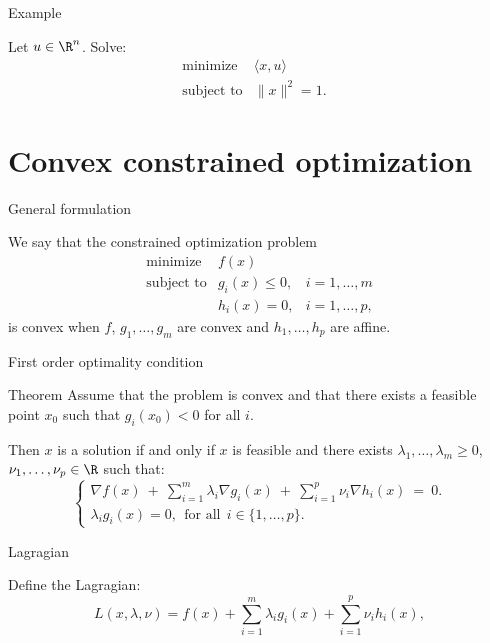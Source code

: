 \documentclass{beamer}
\begin{document}
\begin{frame}[t]{Example}
	\grid

	Let $u \in \R^n$. Solve:
	$$
		\begin{array}{lll}
			\text{minimize} & \langle x,u \rangle & \\
			\text{subject to} & \|x\|^2 = 1.
		\end{array}
	$$
\end{frame}


\section{Convex constrained optimization}


\begin{frame}[t]{General formulation}
	\grid

	We say that the constrained optimization problem
	\begin{equation}
		\begin{array}{lll}
			\text{minimize} & f(x) & \\
			\text{subject to} & g_i(x) \leq 0, & i=1, \dots, m \\
							  & h_i(x) = 0, & i=1, \dots, p,
		\end{array}
	\end{equation}
	is convex when $f$, $g_1, \dots, g_m$ are convex and $h_1, \dots, h_p$ are affine.
\end{frame}

\begin{frame}[t]{First order optimality condition}
	\grid

	\vspace{-0.4cm}
	\begin{block}{Theorem}
		Assume that the problem is convex and that there exists a feasible point $x_0$ such that $g_i(x_0) < 0$ for all $i$.

		Then $x$ is a solution if and only if $x$ is feasible and there exists $\lambda_1, \dots, \lambda_m \geq 0$, $\nu_1, \dots, \nu_p \in \R$ such that:
		$$
		\begin{cases}
			\displaystyle
			\nabla f(x) \ + \ \sum_{i=1}^m \lambda_i \nabla g_i(x) \ + \ \sum_{i=1}^p \nu_i \nabla h_i(x)  \ = \ 0. \\
			\lambda_i g_i(x) = 0, \ \ \text{for all} \ \ i \in \{1, \dots, p\}.
		\end{cases}
		$$
	\end{block}

\end{frame}
\begin{frame}[t]{Lagragian}
	\grid

	Define the Lagragian:
\begin{equation}
	L(x,\lambda,\nu) = 
	f(x) + \sum_{i=1}^m \lambda_i g_i(x) + \sum_{i=1}^p \nu_i h_i(x),
\end{equation}
	 
\end{frame}
\end{document}

